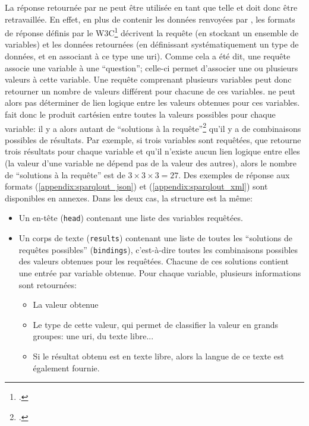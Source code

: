 La réponse retournée par \wkd{} ne peut être utilisée en tant que telle et doit donc être retravaillée. En effet, en plus de contenir les données renvoyées par \sparql{}, les formats de réponse définis par le W3C\footcite{beckett_sparql_2013} décrivent la requête (en stockant un ensemble de variables) et les données retournées (en définissant systématiquement un type de données, et en associant à ce type une \gls{uri}). Comme cela a été dit, une requête \sparql{} associe une variable à une \enquote{question}; celle-ci permet d'associer une ou plusieurs valeurs à cette variable. Une requête comprenant plusieurs variables peut donc retourner un nombre de valeurs différent pour chacune de ces variables. \sparql{} ne peut alors pas déterminer de lien logique entre les valeurs obtenues pour ces variables. \sparql{} fait donc le produit cartésien entre toutes la valeurs possibles pour chaque variable: il y a alors autant de \enquote{solutions à la requête}\footcite[§2.3.1. Variable Binding Results]{beckett_sparql_2013} qu'il y a de combinaisons possibles de résultats. Par exemple, si trois variables sont requêtées, que \sparql{} retourne trois résultats pour chaque variable et qu'il n'existe aucun lien logique entre elles (la valeur d'une variable ne dépend pas de la valeur des autres), alors le nombre de \enquote{solutions à la requête} est de \(3 \times 3 \times 3 = 27\). Des exemples de réponse aux formats \json{} (\ref{appendix:sparqlout_json}) et \xml{} (\ref{appendix:sparqlout_xml}) sont disponibles en annexes. Dans les deux cas, la structure est la même:

\begin{itemize}
	\item Un en-tête (\texttt{head}) contenant une liste des variables requêtées.
	\item Un corps de texte (\texttt{results}) contenant une liste de toutes les \enquote{solutions de requêtes possibles} (\texttt{bindings}), c'est-à-dire toutes les combinaisons possibles des valeurs obtenues pour les requêtées. Chacune de ces solutions contient une entrée par variable obtenue. Pour chaque variable, plusieurs informations sont retournées:
	\begin{itemize}
		\item La valeur obtenue
		\item Le type de cette valeur, qui permet de classifier la valeur en grands groupes: une \gls{uri}, du texte libre... 
		\item Si le résultat obtenu est en texte libre, alors la langue de ce texte est également fournie.
	\end{itemize} 
\end{itemize}

